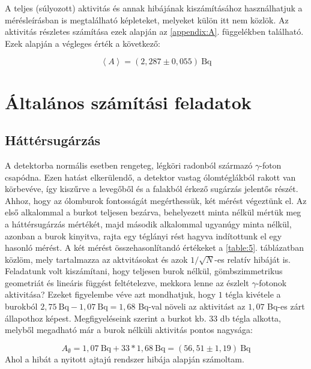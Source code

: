 \begin{multicols}{2}
A teljes (súlyozott) aktivitás és annak hibájának kiszámításához használhatjuk a mérésleírásban is megtalálható képleteket, melyeket külön itt nem közlök. Az aktivitás részletes számítása ezek alapján az \ref{appendix:A}. függelékben található. Ezek alapján a végleges érték a következő:

\begin{equation}
\left< A \right>
=
\left( 2,287 \pm 0,055 \right)\ \text{Bq} 
\end{equation}


\section{Általános számítási feladatok}
\subsection{Háttérsugárzás}
A detektorba normális esetben rengeteg, légköri radonból származó $\gamma$-foton csapódna. Ezen hatást elkerülendő, a detektor vastag ólomtéglákból rakott  van körbevéve, így kiszűrve a levegőből  és a falakból érkező sugárzás jelentős részét. Ahhoz, hogy az ólomburok fontosságát megérthessük, két mérést végeztünk el. Az első alkalommal a burkot teljesen bezárva, behelyezett minta nélkül mértük meg a háttérsugárzás mértékét, majd második alkalommal ugyanúgy minta nélkül, azonban a burok  kinyitva, rajta egy téglányi rést hagyva indítottunk el egy hasonló mérést. \newline
A két mérést összehasonlítandó értékeket a \ref{table:5}. táblázatban közlöm, mely tartalmazza az aktvitásokat és azok $1/\sqrt{N}$-es relatív hibáját is. Feladatunk volt kiszámítani, hogy teljesen burok nélkül, gömbszimmetrikus geometriát és lineáris függést feltételezve, mekkora lenne az észlelt $\gamma$-fotonok aktivitása? Ezeket figyelembe véve azt mondhatjuk, hogy $1$ tégla kivétele a burokból $2,75\ \text{Bq} - 1,07\ \text{Bq} = 1,68$ Bq-val növeli az aktivitást az $1,07$ Bq-es zárt állapothoz képest. Megfigyeléseink szerint a burkot kb. $33$ db tégla alkotta, melyből megadható már a burok nélküli aktivitás pontos nagysága:

\begin{equation}
A_{\emptyset}
=
1,07\ \text{Bq} + 33 * 1,68\ \text{Bq}
=
\left( 56,51 \pm 1,19 \right)\ \text{Bq}
\end{equation}
Ahol a hibát a nyitott ajtajú rendszer hibája alapján számoltam.

\end{multicols}